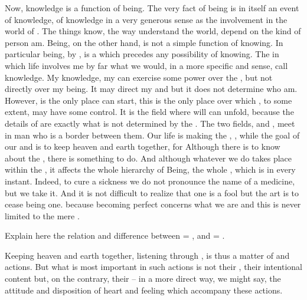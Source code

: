 \pa Now, knowledge is a function of being.  The very fact of being is 
in itself an event of knowledge, of knowledge in a very generous sense 
as the involvement in the world of . 
The things  know,
the way  understand the world, depend on
the kind of person  am.  Being, on the other hand,
is not a simple function of knowing. 
In particular  being,  by 
, is a  which precedes any possibility of 
knowing.
The  in which 
life involves me by far  what we would, in a more specific 
and  sense, call knowledge. 
My knowledge, my 
can exercise some power over the , but not
directly over my being.  It may direct my  and
 but it does not determine who  am.  However,
 is the only place  can start, this is the only
place over which , to some extent, may have some control.  It is
the field where  will can unfold, because the details of
 are exactly what is not determined by the
.  The two fields, 
and , meet in man who is a border between them.  Our
life is making the , , while the goal of our  and  is to keep
heaven and earth together, for %
Although there is  to know about the , there is
something to do.  And although whatever we do takes place within the
\hoa, it affects the whole hierarchy of Being, the whole ,
which is  in every  instant.
Indeed, to cure a sickness we do not pronounce the name of a 
medicine, but we take it. And it is not difficult to realize that one 
is a fool but the art is to cease being one. 
because becoming perfect concerns what we are and this is never 
limited to the mere .

\say
Explain here the relation and difference between  = , and  = .

\pa
Keeping heaven and earth together, listening through , 
is thus a matter of  and  actions. But what is 
most important in such actions is not their , their 
intentional content but, on the contrary, their  --
in a more direct way, we might say, the attitude and disposition of 
heart and feeling which accompany these actions.

